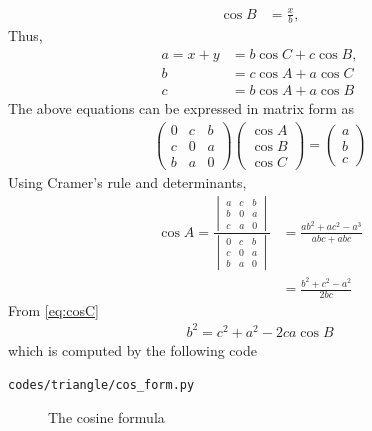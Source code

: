 \begin{enumerate}[label=\arabic*.,ref=\thesubsection.\theenumi]
\begin{align}
\\
\cos B &= \frac{x}{b},
\end{align}
%
Thus, 
%
\begin{align}
a=x+y &= b \cos C + c \cos B, \\
b &= c \cos A + a \cos C \\
c &= b \cos A + a \cos B
\end{align}
%
  The above equations can be expressed in matrix form as
%
\begin{align}
\begin{pmatrix}
0 & c & b \\
c & 0 & a \\
b & a & 0
\end{pmatrix}
\begin{pmatrix}
\cos A \\
\cos B \\
\cos C
\end{pmatrix}
= 
\begin{pmatrix}
a\\
b\\
c
\end{pmatrix}
\end{align}
%
Using Cramer's rule and determinants,
%
\begin{align}
\cos A = \frac{
\begin{vmatrix}
a & c & b \\
b & 0 & a \\
c & a & 0
\end{vmatrix}
	}
	{
\begin{vmatrix}
0 & c & b \\
c & 0 & a \\
b & a & 0
\end{vmatrix}
	}
	&=\frac{ab^2 + ac^2 - a^3}{abc + abc} 
\\
&= \frac{b^2 + c^2 - a^2}{2bc}
\label{eq:cosC}
\end{align}
From \eqref{eq:cosC}
\begin{align}
\label{eq:b_cos_form}
b^2 = c^2+a^2-2ca\cos B
\end{align}
which is computed by the following code
\begin{lstlisting}
codes/triangle/cos_form.py
\end{lstlisting}
%
\begin{figure}[!ht]
	\begin{center}
		
		\resizebox{\columnwidth}{!}{}
	\end{center}
	\caption{The cosine formula}
	\label{ch2_cosine_formula}	
\end{figure}


\end{enumerate}
